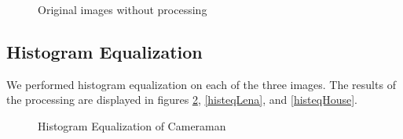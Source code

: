 \documentclass[journal]{IEEEtran}
\begin{document}
\begin{figure}[h]
\centering
{}
\caption{Original images without processing}
\label{originalPics}
\end{figure}

\subsection{Histogram Equalization}
We performed histogram equalization on each of the three images. The results of the processing are displayed in figures \ref{histeqCameraman}, \ref{histeqLena}, and \ref{histeqHouse}.


\begin{figure}[!h]
\centering
{}
\caption{Histogram Equalization of Cameraman}
\label{histeqCameraman}
\end{figure}
\end{document}
